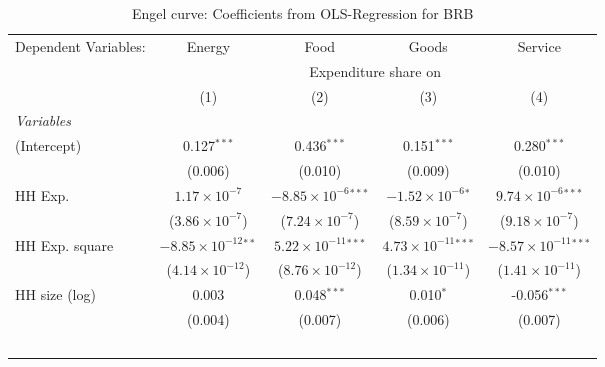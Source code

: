 
\begin{table}[htbp!]
   \centering
   \small
   \begin{adjustbox}{width = 1\textwidth, max height = 0.95\textheight, center}
      \begin{threeparttable}[b]
         \caption{\label{tab:Engel_parametric_BRB} Engel curve: Coefficients from OLS-Regression for BRB}
         \begin{tabular}{lcccc}
            \tabularnewline \midrule \midrule
            Dependent Variables: & Energy                         & Food                           & Goods                          & Service\\  
             & \multicolumn{4}{c}{Expenditure share on} \\ 
                                 & (1)                            & (2)                            & (3)                            & (4)\\  
            \midrule
            \emph{Variables}\\
            (Intercept)          & 0.127$^{***}$                  & 0.436$^{***}$                  & 0.151$^{***}$                  & 0.280$^{***}$\\   
                                 & (0.006)                        & (0.010)                        & (0.009)                        & (0.010)\\   
            HH Exp.              & $1.17\times 10^{-7}$           & $-8.85\times 10^{-6}$$^{***}$  & $-1.52\times 10^{-6}$$^{*}$    & $9.74\times 10^{-6}$$^{***}$\\    
                                 & ($3.86\times 10^{-7}$)         & ($7.24\times 10^{-7}$)         & ($8.59\times 10^{-7}$)         & ($9.18\times 10^{-7}$)\\    
            HH Exp. square       & $-8.85\times 10^{-12}$$^{**}$  & $5.22\times 10^{-11}$$^{***}$  & $4.73\times 10^{-11}$$^{***}$  & $-8.57\times 10^{-11}$$^{***}$\\    
                                 & ($4.14\times 10^{-12}$)        & ($8.76\times 10^{-12}$)        & ($1.34\times 10^{-11}$)        & ($1.41\times 10^{-11}$)\\    
            HH size (log)        & 0.003                          & 0.048$^{***}$                  & 0.010$^{*}$                    & -0.056$^{***}$\\   
                                 & (0.004)                        & (0.007)                        & (0.006)                        & (0.007)\\   
$$
\end{tabular}
\end{threeparttable}
\end{adjustbox}
\end{table}
